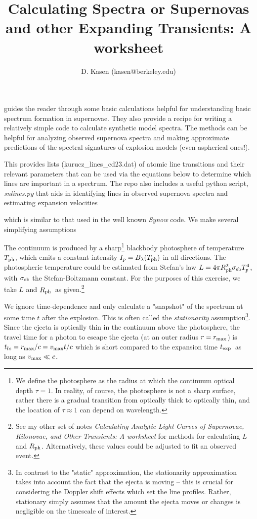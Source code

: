 \documentclass{tufte-handout}
\title{Calculating Spectra or Supernovas and other Expanding Transients: A worksheet}
\author{D. Kasen (kasen@berkeley.edu)}
\date{}
\newcommand{\texp}{\ensuremath{t_{\rm exp}}}
\newcommand{\Rph}{\ensuremath{R_{\rm ph}}}
\newcommand{\Tph}{\ensuremath{T_{\rm ph}}}
\begin{document}
\maketitle

\setcounter{quest}{0}


 guides the reader through some basic calculations helpful for understanding basic spectrum formation in supernovae. They also provide a recipe for writing a relatively simple
code to calculate synthetic model spectra.  The methods can be helpful for analyzing observed supernova spectra and making approximate predictions of the spectral signatures of explosion models (even aspherical ones!). 

This  provides lists (kurucz\_lines\_cd23.dat) of atomic line
transitions and their relevant parameters that can be used via the equations below to determine which lines are important in a spectrum.
The repo also includes a useful python script, {\it snlines.py} that aids in identifying lines in observed supernova spectra and estimating expansion velocities 

 which is similar to that used in the well known {\it Synow} code. We make several simplifying assumptions

  The continuum is produced by a sharp\footnote{We define the photosphere as the radius at which the continuum optical depth $\tau = 1$. In reality, of course, the photosphere is not a sharp surface, rather there is a gradual transition from  optically thick to  optically thin, and the location of $\tau \approx 1$ can depend on wavelength.} blackbody photosphere of temperature \Tph, which emits a constant intensity
$I_p = B_\lambda(\Tph)$ in all directions.  The photospheric 
temperature could be estimated from  Stefan's law $L = 4 \pi \Rph^2 \sigma_{\rm sb} T_p^4$, with $\sigma_{\rm sb}$ the Stefan-Boltzmann constant. For the purposes of this exercise, we take $L$ and \Rph\ as given.\footnote{See my other set of notes {\it Calculating Analytic Light Curves of Supernovae, Kilonovae, and Other Transients: A worksheet} for methods for calculating $L$ and \Rph. Alternatively, these values could be adjusted to fit an observed event.}

 We ignore time-dependence and only calculate a "snapshot" of the spectrum at some time $t$ after the explosion. This is often called the {\it stationarity} assumption\footnote{In contrast to the "static" approximation, the stationarity approximation
takes into account the fact that the ejecta is moving -- this is crucial for considering the Doppler shift effects which set the line profiles.
Rather, stationary simply assumes that the amount the ejecta moves  or changes is negligible on the timescale of interest.}.
Since the ejecta is optically thin in the continuum above the photosphere,
the travel time for a photon to escape the ejecta (at an outer radius $r = r_{\rm max}$) is 
$t_{ lc} = r_{\rm max}/c =  v_{\rm max} t/c$ which is short compared to the expansion time \texp\ as long as $v_{\rm max} \ll c$.
\end{document}
